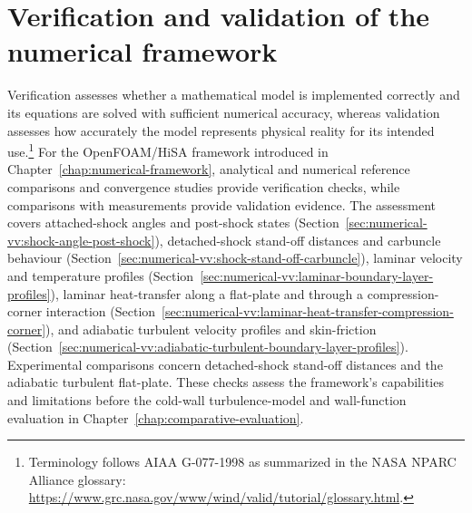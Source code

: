 \chapter{Verification and validation of the numerical framework}
\label{chap:numerical-verification-validation}


Verification assesses whether a mathematical model is implemented correctly and
its equations are solved with sufficient numerical accuracy, whereas validation
assesses how accurately the model represents physical reality for its intended
use.\footnote{Terminology follows AIAA G-077-1998 as summarized in the NASA
NPARC Alliance glossary: \url{https://www.grc.nasa.gov/www/wind/valid/tutorial/glossary.html}.}
For the OpenFOAM/HiSA framework introduced in Chapter~\ref{chap:numerical-framework},
analytical and numerical reference comparisons and convergence studies provide
verification checks, while comparisons with measurements provide validation
evidence. The assessment covers attached-shock angles and post-shock states
(Section~\ref{sec:numerical-vv:shock-angle-post-shock}), detached-shock stand-off
distances and carbuncle behaviour
(Section~\ref{sec:numerical-vv:shock-stand-off-carbuncle}), laminar velocity and
temperature profiles
(Section~\ref{sec:numerical-vv:laminar-boundary-layer-profiles}), laminar heat-transfer along a flat-plate and through a compression-corner interaction
(Section~\ref{sec:numerical-vv:laminar-heat-transfer-compression-corner}), and
adiabatic turbulent velocity profiles and skin-friction
(Section~\ref{sec:numerical-vv:adiabatic-turbulent-boundary-layer-profiles}).
Experimental comparisons concern detached-shock stand-off distances and the
adiabatic turbulent flat-plate. These checks assess the framework's capabilities
and limitations before the cold-wall turbulence-model and wall-function
evaluation in Chapter~\ref{chap:comparative-evaluation}.






